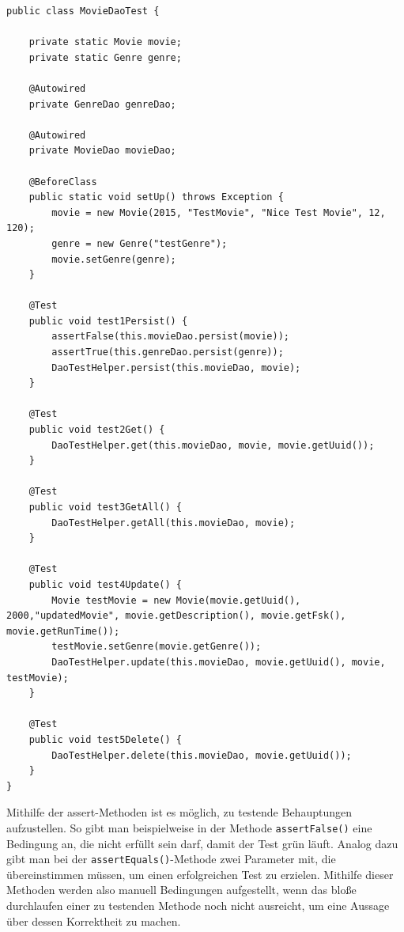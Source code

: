 	\begin{lstlisting}
public class MovieDaoTest {

	private static Movie movie;
	private static Genre genre;
	
	@Autowired
	private GenreDao genreDao;
	
	@Autowired
	private MovieDao movieDao;
	
	@BeforeClass
	public static void setUp() throws Exception {
		movie = new Movie(2015, "TestMovie", "Nice Test Movie", 12, 120);
		genre = new Genre("testGenre");
		movie.setGenre(genre);
	}
	
	@Test
	public void test1Persist() {
		assertFalse(this.movieDao.persist(movie));
		assertTrue(this.genreDao.persist(genre));
		DaoTestHelper.persist(this.movieDao, movie);
	}
	
	@Test
	public void test2Get() {
		DaoTestHelper.get(this.movieDao, movie, movie.getUuid());
	}
	
	@Test
	public void test3GetAll() {
		DaoTestHelper.getAll(this.movieDao, movie);
	}
	
	@Test
	public void test4Update() {
		Movie testMovie = new Movie(movie.getUuid(), 2000,"updatedMovie", movie.getDescription(), movie.getFsk(), movie.getRunTime());
		testMovie.setGenre(movie.getGenre());
		DaoTestHelper.update(this.movieDao, movie.getUuid(), movie, testMovie);
	}
	
	@Test
	public void test5Delete() {
		DaoTestHelper.delete(this.movieDao, movie.getUuid());
	}
}
	\end{lstlisting}
	Mithilfe der assert-Methoden ist es möglich, zu testende Behauptungen aufzustellen. So gibt man beispielweise in der Methode \texttt{assertFalse()} eine Bedingung an, die nicht erfüllt sein darf, damit der Test grün läuft. Analog dazu gibt man bei der \texttt{assertEquals()}-Methode zwei Parameter mit, die übereinstimmen müssen, um einen erfolgreichen Test zu erzielen.
	Mithilfe dieser Methoden werden also manuell Bedingungen aufgestellt, wenn das bloße durchlaufen einer zu testenden Methode noch nicht ausreicht, um eine Aussage über dessen Korrektheit zu machen.
	
